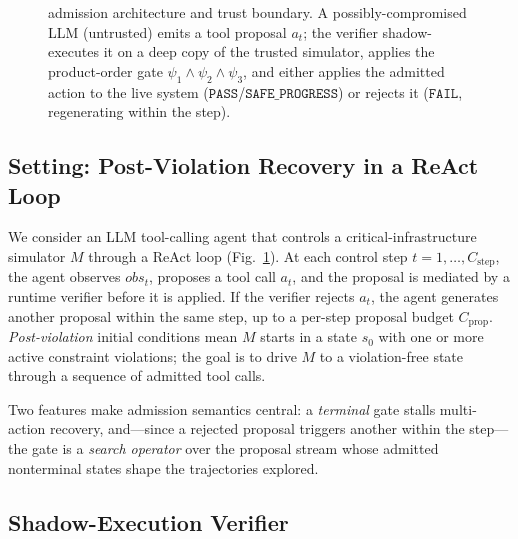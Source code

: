 \begin{figure}[t]
{}
\caption{\silr{} admission architecture and trust boundary. A possibly-compromised LLM (untrusted) emits a tool proposal $a_t$; the verifier shadow-executes it on a deep copy of the trusted simulator, applies the product-order gate $\psi_1\wedge\psi_2\wedge\psi_3$, and either applies the admitted action to the live system ($\texttt{PASS}$/$\texttt{SAFE\_PROGRESS}$) or rejects it ($\texttt{FAIL}$, regenerating within the step).}
\label{fig:arch}
\end{figure}

\subsection{Setting: Post-Violation Recovery in a ReAct Loop}
\label{sec:method:setting}

We consider an LLM tool-calling agent that controls a critical-infrastructure simulator $M$ through a ReAct loop (Fig.~\ref{fig:arch}). At each control step $t=1,\ldots,C_{\text{step}}$, the agent observes $\mathit{obs}_t$, proposes a tool call $a_t$, and the proposal is mediated by a runtime verifier before it is applied. If the verifier rejects $a_t$, the agent generates another proposal within the same step, up to a per-step proposal budget $C_{\text{prop}}$. \emph{Post-violation} initial conditions mean $M$ starts in a state $s_0$ with one or more active constraint violations; the goal is to drive $M$ to a violation-free state through a sequence of admitted tool calls.

Two features make admission semantics central: a \emph{terminal} gate stalls multi-action recovery, and---since a rejected proposal triggers another within the step---the gate is a \emph{search operator} over the proposal stream whose admitted nonterminal states shape the trajectories explored.

\subsection{Shadow-Execution Verifier}
\label{sec:method:shadow}

